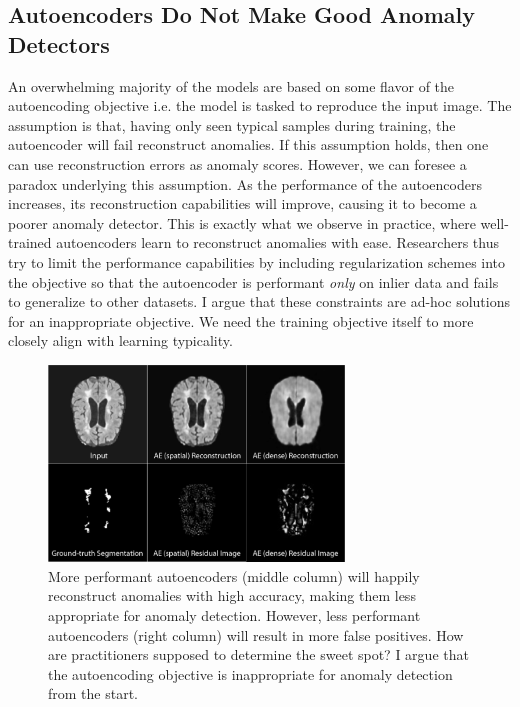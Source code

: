 \subsection*{Autoencoders Do Not Make Good Anomaly Detectors}
An overwhelming majority of the models are based on some flavor of the autoencoding objective \cite{baur_deep_2019,baur2021,tschuchnig_anomaly_2022,kascenasRoleNoiseDenoising2023} i.e. the model is tasked to reproduce the input image. The assumption is that, having only seen typical samples during training, the autoencoder will fail reconstruct anomalies. If this assumption holds, then one can use reconstruction errors as anomaly scores. However, we can foresee a paradox underlying this assumption. As the performance of the autoencoders increases, its reconstruction capabilities will improve, causing it to become a poorer anomaly detector. This is exactly what we observe in practice, where well-trained autoencoders learn to reconstruct anomalies with ease. Researchers thus try to limit the performance capabilities by including regularization schemes into the objective so that the autoencoder is performant \textit{only} on inlier data and fails to generalize to other datasets. I argue that these constraints are ad-hoc solutions for an inappropriate objective. We need the training objective itself to more closely align with learning typicality. 

\begin{figure}[tbhp]
\centering
    \centering
    \includegraphics[width=0.7\textwidth]{figures/ae_failure.jpg}
    \caption{More performant autoencoders (middle column) will happily reconstruct anomalies with high accuracy, making them less appropriate for anomaly detection. However, less performant autoencoders (right column) will result in more false positives. How are practitioners supposed to determine the sweet spot? I argue that the autoencoding objective is inappropriate for anomaly detection from the start.}
    \label{fig:ae_failure}
\end{figure}%


